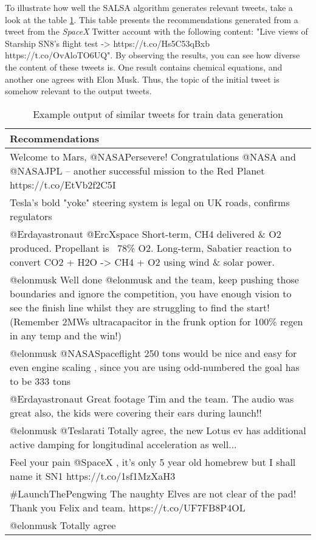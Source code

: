 To illustrate how well the SALSA algorithm generates relevant tweets, take a look at the table \ref{tab:example-train-data}. This table presents the recommendations generated from a tweet from the \emph{SpaceX} Twitter account with the following content: "Live views of Starship SN8’s flight test -> https://t.co/Hs5C53qBxb https://t.co/OvAloTO6UQ". By observing the results, you can see how diverse the content of these tweets is. One result contains chemical equations, and another one agrees with Elon Musk. Thus, the topic of the initial tweet is somehow relevant to the output tweets.

\begin{table}[!ht]
    \centering
    \caption{Example output of similar tweets for train data generation}
    \label{tab:example-train-data}
    \begin{tabular}{|m{}|}
        \hline
        \textbf{Recommendations} \\
        \hline
        Welcome to Mars, @NASAPersevere! Congratulations @NASA and @NASAJPL – another successful mission to the Red Planet https://t.co/EtVb2f2C5I \\
        \hline
        Tesla’s bold "yoke" steering system is legal on UK roads, confirms regulators \\
        \hline
        @Erdayastronaut @ErcXspace Short-term, CH4 delivered \& O2 produced. Propellant is ~78\% O2. Long-term, Sabatier reaction to convert CO2 + H2O -> CH4 + O2 using wind \& solar power. \\
        \hline
        @elonmusk Well done @elonmusk and the team, keep pushing those boundaries and ignore the competition,  you have enough vision to see the finish line whilst they are struggling to find the start! (Remember 2MWs ultracapacitor in the frunk option for 100\% regen in any temp and the win!) \\
        \hline
        @elonmusk @NASASpaceflight 250 tons would be nice and easy for even engine scaling , since you are using odd-numbered the goal has to be 333 tons \\
        \hline
        @Erdayastronaut Great footage Tim and the team. The audio was great also,  the kids were covering their ears during launch!! \\
        \hline
        @elonmusk @Teslarati Totally agree, the new Lotus ev has additional active damping for longitudinal acceleration as well... \\
        \hline
        Feel your pain @SpaceX , it's only 5 year old homebrew but I shall name it SN1 https://t.co/1sf1MzXaH3 \\
        \hline
        \#LaunchThePengwing The naughty Elves are not clear of the pad! Thank you Felix and team. https://t.co/UF7FB8P4OL \\
        \hline
        @elonmusk Totally agree \\
        \hline
    \end{tabular}
\end{table}


